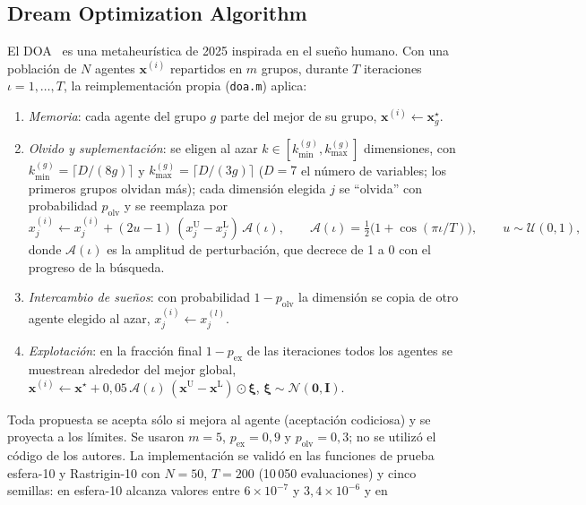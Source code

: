 \documentclass[11pt,a4paper]{article}
\newcommand{\vect}[1]{\bm{#1}}
\begin{document}
\subsection{Dream Optimization Algorithm}
El DOA~\cite{lang2025} es una metaheur\'istica de 2025 inspirada en el sue\~no humano.
Con una poblaci\'on de $N$ agentes $\vect{x}^{(i)}$ repartidos en $m$ grupos, durante
$T$ iteraciones $\iota=1,\dots,T$, la reimplementaci\'on propia (\texttt{doa.m}) aplica:
\begin{enumerate}[leftmargin=1.6em]
  \item \emph{Memoria}: cada agente del grupo $g$ parte del mejor de su grupo,
  $\vect{x}^{(i)}\leftarrow\vect{x}^{\star}_g$.
  \item \emph{Olvido y suplementaci\'on}: se eligen al azar $k\in[k^{(g)}_{\min},k^{(g)}_{\max}]$
  dimensiones, con $k^{(g)}_{\min}=\lceil D/(8g)\rceil$ y $k^{(g)}_{\max}=\lceil D/(3g)\rceil$
  ($D=7$ el n\'umero de variables; los primeros grupos olvidan m\'as); cada dimensi\'on
  elegida $j$ se ``olvida'' con probabilidad $p_{\mathrm{olv}}$ y se reemplaza por
  \begin{equation}
  x^{(i)}_j \leftarrow x^{(i)}_j + (2u-1)\,(x^{\mathrm{U}}_j - x^{\mathrm{L}}_j)\,\mathcal{A}(\iota),\qquad
  \mathcal{A}(\iota)=\tfrac{1}{2}\big(1+\cos(\pi\iota/T)\big),\qquad u\sim\mathcal{U}(0,1),
  \label{eq:doa}
  \end{equation}
  donde $\mathcal{A}(\iota)$ es la amplitud de perturbaci\'on, que decrece de 1 a 0 con el
  progreso de la b\'usqueda.
  \item \emph{Intercambio de sue\~nos}: con probabilidad $1-p_{\mathrm{olv}}$ la dimensi\'on
  se copia de otro agente elegido al azar, $x^{(i)}_j\leftarrow x^{(l)}_j$.
  \item \emph{Explotaci\'on}: en la fracci\'on final $1-p_{\mathrm{ex}}$ de las iteraciones
  todos los agentes se muestrean alrededor del mejor global,
  $\vect{x}^{(i)}\leftarrow\vect{x}^{\star}+0{,}05\,\mathcal{A}(\iota)\,(\vect{x}^{\mathrm{U}}-\vect{x}^{\mathrm{L}})\odot\vect{\xi}$,
  $\vect{\xi}\sim\mathcal{N}(\vect{0},\vect{I})$.
\end{enumerate}
Toda propuesta se acepta s\'olo si mejora al agente (aceptaci\'on codiciosa) y se
proyecta a los l\'imites. Se usaron $m=5$, $p_{\mathrm{ex}}=0{,}9$ y $p_{\mathrm{olv}}=0{,}3$; no se
utiliz\'o el c\'odigo de los autores. La implementaci\'on se valid\'o en las funciones de
prueba esfera-10 y Rastrigin-10 con $N=50$, $T=200$ (10\,050 evaluaciones) y cinco
semillas: en esfera-10 alcanza valores entre $6\times10^{-7}$ y $3{,}4\times10^{-6}$ y en
\end{document}
